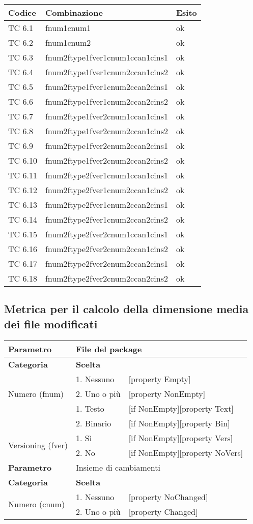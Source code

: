 \begin{tabular}{|p{3cm}|p{7cm}|p{3cm}|}
	\hline
	\rowcolor{Gray}
	\textbf{Codice} & \textbf{Combinazione} & \textbf{Esito}\tabularnewline
	\hline
	TC 6.1			& fnum1cnum1					& ok \tabularnewline
	\hline
	TC 6.2			& fnum1cnum2					& ok \tabularnewline
	\hline
	TC 6.3			& fnum2ftype1fver1cnum1ccan1cins1		& ok \tabularnewline
	\hline
	TC 6.4			& fnum2ftype1fver1cnum2ccan1cins2		& ok \tabularnewline
	\hline
	TC 6.5			& fnum2ftype1fver1cnum2ccan2cins1		& ok \tabularnewline
	\hline
	TC 6.6			& fnum2ftype1fver1cnum2ccan2cins2		& ok \tabularnewline
	\hline
	TC 6.7			& fnum2ftype1fver2cnum1ccan1cins1		& ok \tabularnewline
	\hline
	TC 6.8			& fnum2ftype1fver2cnum2ccan1cins2		& ok \tabularnewline
	\hline
	TC 6.9			& fnum2ftype1fver2cnum2ccan2cins1		& ok \tabularnewline
	\hline
	TC 6.10			& fnum2ftype1fver2cnum2ccan2cins2		& ok \tabularnewline
	\hline
	TC 6.11			& fnum2ftype2fver1cnum1ccan1cins1		& ok \tabularnewline
	\hline
	TC 6.12			& fnum2ftype2fver1cnum2ccan1cins2		& ok \tabularnewline
	\hline
	TC 6.13			& fnum2ftype2fver1cnum2ccan2cins1		& ok \tabularnewline
	\hline
	TC 6.14			& fnum2ftype2fver1cnum2ccan2cins2		& ok \tabularnewline
	\hline
	TC 6.15			& fnum2ftype2fver2cnum1ccan1cins1		& ok \tabularnewline
	\hline
	TC 6.16			& fnum2ftype2fver2cnum2ccan1cins2		& ok \tabularnewline
	\hline
	TC 6.17			& fnum2ftype2fver2cnum2ccan2cins1		& ok \tabularnewline
	\hline
	TC 6.18			& fnum2ftype2fver2cnum2ccan2cins2		& ok \tabularnewline
	\hline
\end{tabular}
\clearpage




\subsection{Metrica per il calcolo della dimensione media dei file modificati}

\begin{tabular}{|p{4cm}|p{4cm}p{5cm}|}
	\hline
	\cellcolor{Gray} \textbf{Parametro}				& \multicolumn{2}{l|}{File del package}							\tabularnewline
	\hline
	\rowcolor{Gray}
	\textbf{Categoria}						& \textbf{Scelta}			&						\tabularnewline
	\hline
	\multirow{3}{*}{Numero (fnum)}					& 1. Nessuno				&	[property Empty] 			\tabularnewline
									\cline{2-3}
									& 2. Uno o più				&	[property NonEmpty]			\tabularnewline
	\hline
	\multirow{2}{*}{Tipo (ftype)}					& 1. Testo				&	[if NonEmpty][property Text] 		\tabularnewline
									\cline{2-3}
									& 2. Binario				&	[if NonEmpty][property Bin]		\tabularnewline
	\hline
	\multirow{2}{*}{Versioning (fver)}				& 1. Sì					&	[if NonEmpty][property Vers] 		\tabularnewline
									\cline{2-3}
									& 2. No					&	[if NonEmpty][property NoVers]		\tabularnewline
	\hline
	
	\cellcolor{Gray} \textbf{Parametro}				& \multicolumn{2}{l|}{Insieme di cambiamenti}						\tabularnewline
	\hline
	\rowcolor{Gray}
	\textbf{Categoria}						& \textbf{Scelta}			&						\tabularnewline
	\hline
	\multirow{3}{*}{Numero (cnum)}					& 1. Nessuno				&	[property NoChanged] 			\tabularnewline
									\cline{2-3}
									& 2. Uno o più				&	[property Changed]			\tabularnewline
	\hline
\end{tabular}

